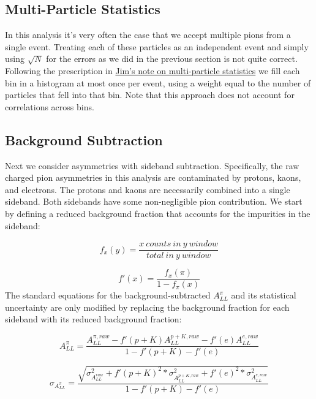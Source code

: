 \subsection{Multi-Particle Statistics}

In this analysis it's very often the case that we accept multiple pions from a
single event. Treating each of these particles as an independent event and
simply using $\sqrt{N}$ for the errors as we did in the previous section is
not quite correct. Following the prescription in
\href{http://www.star.bnl.gov/protected/spin/sowinski/analysis/derivations/multiParticle.pdf}{Jim's
note on multi-particle statistics} we fill each bin in a histogram at most
once per event, using a weight equal to the number of particles that fell into
that bin. Note that this approach does not account for correlations across
bins.

\subsection{Background Subtraction}

Next we consider asymmetries with sideband subtraction. Specifically, the raw
charged pion asymmetries in this analysis are contaminated by protons, kaons,
and electrons. The protons and kaons are necessarily combined into a single
sideband. Both sidebands have some non-negligible pion contribution. We start
by defining a reduced background fraction that accounts for the impurities in
the sideband:

\begin{equation}
  f_{x}(y) = \frac{x~counts~in~y~window}{total~in~y~window}
\end{equation}

\begin{equation}
  f'(x) = \frac{f_{x}(\pi)}{1 - f_{\pi}(x)}
\end{equation}
%
The standard equations for the background-subtracted $A_{LL}^{\pi}$ and its
statistical uncertainty are only modified by replacing the background fraction
for each sideband with its reduced background fraction:

\begin{equation}
  A_{LL}^{\pi} = \frac{ A_{LL}^{\pi,raw} - f'(p+K)A_{LL}^{p+K,raw} - f'(e)A_{LL}^{e,raw} }{1 - f'(p+K) - f'(e) }
  \label{eqn:all}
\end{equation}

\begin{equation}
  \sigma_{A_{LL}^{\pi}} = \frac{\sqrt{ \sigma_{A_{LL}^{raw}}^{2} + f'(p+K)^{2} * \sigma_{A_{LL}^{p+K,raw}}^{2} + f'(e)^{2} * \sigma_{A_{LL}^{e,raw}}^{2} }}{1 - f'(p+K) - f'(e)}
  \label{eqn:sigma-all}
\end{equation}
